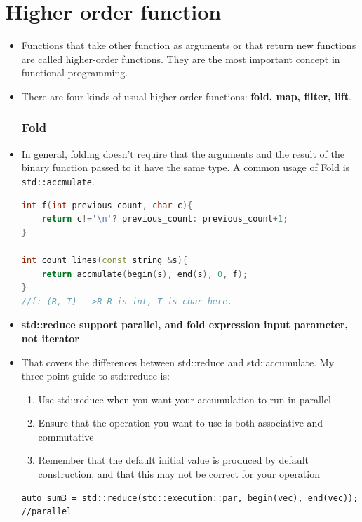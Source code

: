 \documentclass[a4paper,11pt,twoside]{book}
\begin{document}
\section{Higher order function}
\begin{itemize}
		
	\item Functions that take other function as arguments or that return new functions are called higher-order functions. They are the most important concept in functional programming.

	\item There are four kinds of usual higher order functions: \textbf{fold, map, filter, lift}.
	
\subsubsection{Fold}
	
	\item In general, folding doesn't require that the arguments and the result of the binary function passed to it have the same type. A common usage of Fold is \texttt{std::accmulate}.
	
\begin{lstlisting}[frame=single, language=c++]
int f(int previous_count, char c){
   	return c!='\n'? previous_count: previous_count+1;
}
   
int count_lines(const string &s){
   	return accmulate(begin(s), end(s), 0, f);
}
//f: (R, T) -->R R is int, T is char here.
\end{lstlisting} 
	
	\item \textbf{std::reduce support parallel, and fold expression input parameter, not iterator}
	
			\item That covers the differences between std::reduce and std::accumulate. My three point guide to std::reduce is:
	\begin{enumerate}	
			\item Use std::reduce when you want your accumulation to run in parallel
			\item Ensure that the operation you want to use is both associative and commutative
			\item Remember that the default initial value is produced by default construction, and that this may not be correct for your operation
		\end{enumerate}	

\begin{lstlisting}
auto sum3 = std::reduce(std::execution::par, begin(vec), end(vec)); //parallel
\end{lstlisting}


\end{itemize}
\end{document}
